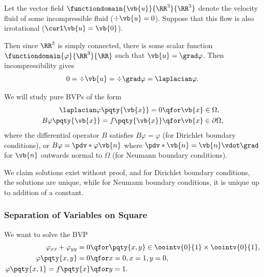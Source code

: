 {\begin{example}
    Let the vector field \(\functiondomain{\vb{u}}{\RR^3}{\RR^3}\) denote the velocity fluid of some incompressible fluid (\(\div \vb{u} = 0\)). Suppose that this flow is also irrotational (\(\curl \vb{u} = \vb{0}\)).

    Then since \(\RR^3\) is simply connected, there is some scalar function \(\functiondomain{\varphi}{\RR^3}{\RR}\) such that \(\vb{u} = \grad \varphi\). Then incompressibility gives
    \begin{equation}
        0 = \div \vb{u} = \div \grad \varphi = \laplacian \varphi.
    \end{equation}
\end{example}

We will study pure BVPs of the form
\begin{subequations}
    \begin{align}
        \laplacian \varphi\pqty{\vb{x}} = 0 &\qfor \vb{x} \in \Omega, \\
        B \varphi\pqty{\vb{x}} = f\pqty{\vb{x}} &\qfor \vb{x} \in \partial \Omega,
    \end{align}
\end{subequations}
where the differential operator \(B\) satisfies \(B \varphi = \varphi\) (for Dirichlet boundary conditions), or \(B \varphi = \pdv*{\varphi}{\vb{n}}\) where \(\pdv*{\vb{n}} = \vb{n} \vdot \grad\) for \(\vb{n}\) outwards normal to \(\Omega\) (for Neumann boundary conditions).

We claim solutions exist without proof, and for Dirichlet boundary conditions, the solutions are unique, while for Neumann boundary conditions, it is unique up to addition of a constant.

\subsubsection{Separation of Variables on Square}

We want to solve the BVP
\begin{subequations}
    \begin{align}
        \varphi_{xx} + \varphi_{yy} = 0 & \qfor \pqty{x, y} \in \oointv{0}{1} \times \oointv{0}{1}, \\
        \varphi\pqty{x, y} = 0 &\qfor x = 0, x = 1, y = 0, \\
        \varphi\pqty{x, 1} = f\pqty{x} &\qfor y = 1.
    \end{align}
\end{subequations}

}
